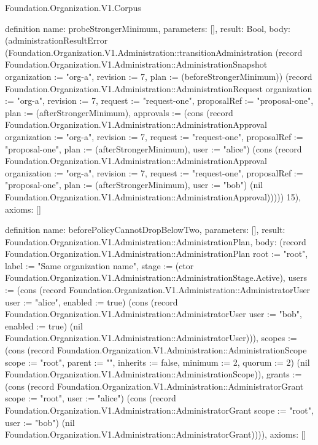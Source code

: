 \begin{lexlean}{Foundation.Organization.V1.Corpus}
\begin{semanticmodule}
definition{
  name: probeStrongerMinimum,
  parameters: [],
  result: Bool,
  body: (administrationResultError (Foundation.Organization.V1.Administration::transitionAdministration (record Foundation.Organization.V1.Administration::AdministrationSnapshot {organization := "org-a", revision := 7, plan := (beforeStrongerMinimum)}) (record Foundation.Organization.V1.Administration::AdministrationRequest {organization := "org-a", revision := 7, request := "request-one", proposalRef := "proposal-one", plan := (afterStrongerMinimum), approvals := (cons (record Foundation.Organization.V1.Administration::AdministrationApproval {organization := "org-a", revision := 7, request := "request-one", proposalRef := "proposal-one", plan := (afterStrongerMinimum), user := "alice"}) (cons (record Foundation.Organization.V1.Administration::AdministrationApproval {organization := "org-a", revision := 7, request := "request-one", proposalRef := "proposal-one", plan := (afterStrongerMinimum), user := "bob"}) (nil Foundation.Organization.V1.Administration::AdministrationApproval)))})) 15),
  axioms: []
}

definition{
  name: beforePolicyCannotDropBelowTwo,
  parameters: [],
  result: Foundation.Organization.V1.Administration::AdministrationPlan,
  body: (record Foundation.Organization.V1.Administration::AdministrationPlan {root := "root", label := "Same organization name", stage := (ctor Foundation.Organization.V1.Administration::AdministrationStage.Active), users := (cons (record Foundation.Organization.V1.Administration::AdministratorUser {user := "alice", enabled := true}) (cons (record Foundation.Organization.V1.Administration::AdministratorUser {user := "bob", enabled := true}) (nil Foundation.Organization.V1.Administration::AdministratorUser))), scopes := (cons (record Foundation.Organization.V1.Administration::AdministrationScope {scope := "root", parent := "", inherits := false, minimum := 2, quorum := 2}) (nil Foundation.Organization.V1.Administration::AdministrationScope)), grants := (cons (record Foundation.Organization.V1.Administration::AdministratorGrant {scope := "root", user := "alice"}) (cons (record Foundation.Organization.V1.Administration::AdministratorGrant {scope := "root", user := "bob"}) (nil Foundation.Organization.V1.Administration::AdministratorGrant)))}),
  axioms: []
}


\end{semanticmodule}
\end{lexlean}
